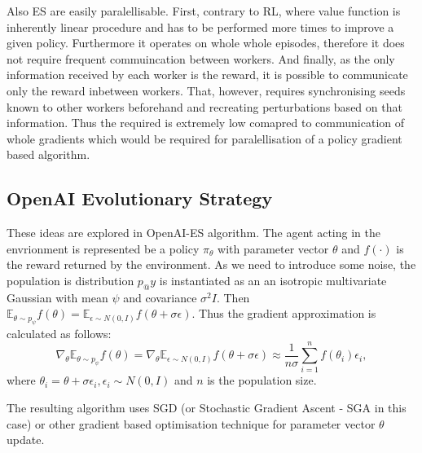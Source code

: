 Also ES are easily paralellisable. First, contrary to RL, where value function is inherently linear procedure and has to be performed more times to improve a given policy. Furthermore it operates on whole whole episodes, therefore it does not require frequent commuincation between workers. And finally, as the only information received by each worker is the reward, it is possible to communicate only the reward inbetween workers. That, however, requires synchronising seeds known to other workers beforehand and recreating perturbations based on that information. Thus the required is extremely low comapred to communication of whole gradients which would be required for paralellisation of a policy gradient based algorithm.

\subsection{OpenAI Evolutionary Strategy}
\label{subsec:openai-es}
These ideas are explored in OpenAI-ES algorithm. The agent acting in the envrionment is represented be a policy $\pi_\theta$  with parameter vector $\theta$ and $f(\cdot)$ is the reward returned by the environment. As we need to introduce some noise, the population is distribution $p_@y$ is instantiated as an an isotropic multivariate Gaussian with mean $\psi$ and covariance $\sigma^2I$. Then $\mathbb{E}_{\theta\sim p_\psi}f(\theta) = \mathbb{E}_{\epsilon\sim N(0,I)}f(\theta+\sigma\epsilon)$. Thus the gradient approximation is calculated as follows:
\begin{equation}
    \nabla_{\theta}\mathbb{E}_{\theta\sim p_\psi}f(\theta) =\nabla_{\theta}\mathbb{E}_{\epsilon\sim N(0,I)}f(\theta+\sigma\epsilon)\approx \frac{1}{n\sigma}\sum_{i=1}^n f(\theta_i)\epsilon_i,  
\end{equation}
where $\theta_i = \theta + \sigma\epsilon_i, \epsilon_i\sim N(0,I)$ and $n$ is the population size.

The resulting algorithm uses SGD (or Stochastic Gradient Ascent - SGA in this case) or other gradient based optimisation technique for parameter vector $\theta$ update.

